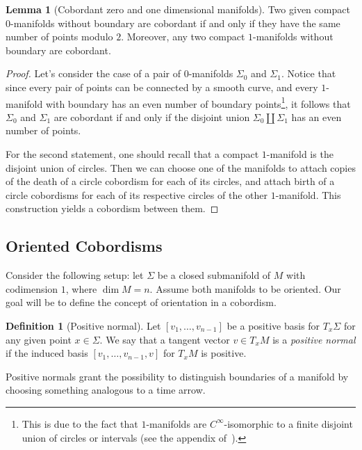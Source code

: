 \documentclass[11pt, reqno]{amsart}
\theoremstyle{definition}
\newtheorem{lemma}[theorem]{Lemma}
\newtheorem{definition}[theorem]{Definition}
\newcommand{\disj}{\amalg}     %
\begin{document}
\begin{lemma}[Cobordant zero and one dimensional manifolds]
\label{lem:cobordant-0-and-1-manifolds}
Two given compact \(0\)-manifolds without boundary are cobordant if and only if
they have the same number of points modulo \(2\). Moreover, any two compact
\(1\)-manifolds without boundary are cobordant.
\end{lemma}

\begin{proof}
Let's consider the case of a pair of \(0\)-manifolds \(\Sigma_0\) and
\(\Sigma_1\). Notice that since every pair of points can be connected by a
smooth curve, and every \(1\)-manifold with boundary has an even number of
boundary points\footnote{This is due to the fact that \(1\)-manifolds are
  \(C^{\infty}\)-isomorphic to a finite disjoint union of circles or intervals
  (see the appendix of~\cite{milnor}).}, it follows that
\(\Sigma_0\) and \(\Sigma_1\) are cobordant if and only if the disjoint union
\(\Sigma_0 \disj \Sigma_1\) has an even number of points.

For the second statement, one should recall that a compact \(1\)-manifold is the
disjoint union of circles. Then we can choose one of the manifolds to
attach copies of the death of a circle cobordism for each of its circles, and
attach birth of a circle cobordisms for each of its respective
circles of the other \(1\)-manifold. This construction yields a cobordism
between them.
\end{proof}

\subsection{Oriented Cobordisms}

Consider the following setup: let \(\Sigma\) be a closed submanifold of \(M\)
with codimension \(1\), where \(\dim M = n\). Assume both manifolds to be
oriented. Our goal will be to define the concept of orientation in a cobordism.

\begin{definition}[Positive normal]
\label{def:positive-normal-manifold}
Let \([v_1, \dots, v_{n-1}]\) be a positive basis for \(T_x \Sigma\) for any
given point \(x \in \Sigma\). We say that a tangent vector \(v \in T_x M\) is a
\emph{positive normal} if the induced basis \([v_1, \dots, v_{n-1}, v]\) for
\(T_x M\) is positive.
\end{definition}

Positive normals grant the possibility to distinguish boundaries of a manifold
by choosing something analogous to a time arrow.
\end{document}
